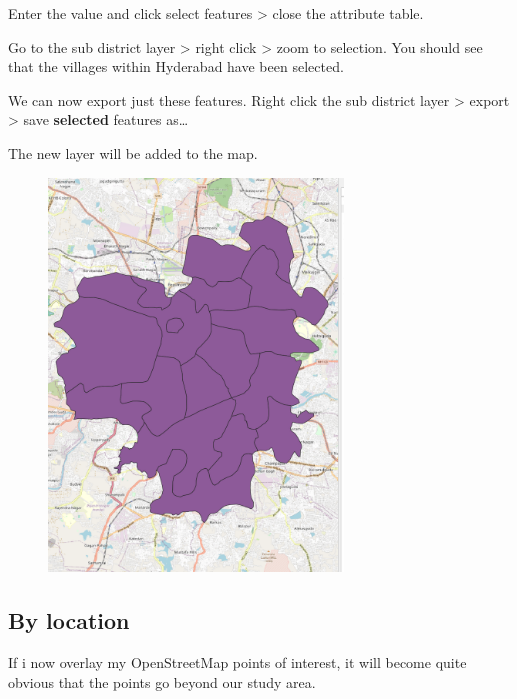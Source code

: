 \documentclass[
  letterpaper,
]{scrbook}
\begin{document}
Enter the value and click select features \textgreater{} close the
attribute table.

Go to the sub district layer \textgreater{} right click \textgreater{}
zoom to selection. You should see that the villages within Hyderabad
have been selected.

We can now export just these features. Right click the sub district
layer \textgreater{} export \textgreater{} save \textbf{selected}
features as\ldots{}

The new layer will be added to the map.

\begin{figure}

{\centering \includegraphics[width=3.08333in,height=\textheight]{general_images/Hyderabad_subdistricts.png}

}

\end{figure}

\hypertarget{by-location}{%
\subsection{By location}\label{by-location}}

If i now overlay my OpenStreetMap points of interest, it will become
quite obvious that the points go beyond our study area.
\end{document}
